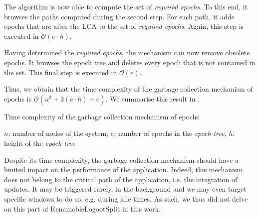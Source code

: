 \documentclass[10pt,journal,compsoc]{IEEEtran}
\let\MYoriglatexcaption\caption
\renewcommand{\caption}[2][\relax]{\MYoriglatexcaption[#2]{#2}}
\newcommand{\eg}{e.g. }
\newcommand{\ie}{i.e. }
\newcommand{\bigO}[1]{$\mathcal{O}(#1)$}
\begin{document}
The algorithm is now able to compute the set of \emph{required epochs}.
To this end, it browses the paths computed during the second step.
For each path, it adds epochs that are after the \ac{LCA} to the set of \emph{required epochs}.
Again, this step is executed in \bigO{e \cdot h}.

Having determined the \emph{required epochs}, the mechanism can now remove obsolete epochs.
It browses the epoch tree and deletes every epoch that is not contained in the set.
This final step is executed in \bigO{e}.

Thus, we obtain that the time complexity of the garbage collection mechanism of epochs is \bigO{n^2 + 3 (e \cdot h) + e}.
We summarise this result in .

\begin{table}[!ht]
    \centering
    \caption{Time complexity of the garbage collection mechanism of epochs}
    \label{tab:time-complexity-gc-mechanism-epochs}
    \caption*{$n$: number of nodes of the system, $e$: number of epochs in the \emph{epoch tree}, $h$: height of the \emph{epoch tree}}
\end{table}

Despite its time complexity, the garbage collection mechanism should have a limited impact on the performance of the application.
Indeed, this mechanism does not belong to the critical path of the application, \ie the integration of updates.
It may be triggered rarely, in the background and we may even target specific windows to do so, \eg during idle times.
As such, we thus did not delve on this part of RenamableLogootSplit in this work.
\end{document}
